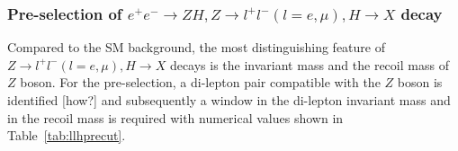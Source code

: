\documentclass[11pt,a4paper]{cepcnote}
\begin{document}
\subsubsection{Pre-selection of $e^+e^- \rightarrow ZH, Z\rightarrow l^+l^-(l=e,\mu), H\rightarrow X$ decay}
Compared to the SM background, the most distinguishing feature of 
$Z\rightarrow l^+l^-(l=e,\mu), H\rightarrow X$ decays is the invariant mass 
and the recoil mass of $Z$ boson. For the pre-selection, a di-lepton pair 
compatible with the $Z$ boson is identified {\color{red}[how?]} 
and subsequently a window in the di-lepton invariant mass and in the recoil mass
is required with numerical values shown in Table~\ref{tab:llhprecut}.
\begin{figure}[H]
	\centering
\end{figure}
\end{document}
